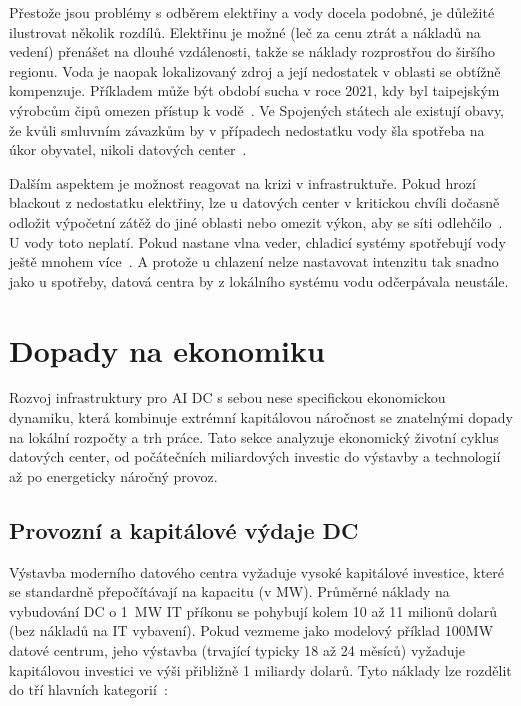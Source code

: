 Přestože jsou problémy s odběrem elektřiny a vody docela podobné, je důležité ilustrovat několik rozdílů. Elektřinu je možné (leč za cenu ztrát a nákladů na vedení) přenášet na dlouhé vzdálenosti, takže se náklady rozprostřou do širšího regionu. Voda je naopak lokalizovaný zdroj a její nedostatek v oblasti se obtížně kompenzuje. Příkladem může být období sucha v roce 2021, kdy byl taipejským výrobcům čipů omezen přístup k vodě~\cite[s.~243]{international_energy_agency_iea_energy_2025}. Ve Spojených státech ale existují obavy, že kvůli smluvním závazkům by v případech nedostatku vody šla spotřeba na úkor obyvatel, nikoli datových center~\cite{shah_four_2026}.

Dalším aspektem je možnost reagovat na krizi v infrastruktuře. Pokud hrozí blackout z nedostatku elektřiny, lze u datových center v kritickou chvíli dočasně odložit výpočetní zátěž do jiné oblasti nebo omezit výkon, aby se síti odlehčilo~\cite[s.~586]{geng_data_2014}. U vody toto neplatí. Pokud nastane vlna veder, chladicí systémy spotřebují vody ještě mnohem více~\cite[s.~3]{li_making_2025}. A protože u chlazení nelze nastavovat intenzitu tak snadno jako u spotřeby, datová centra by z lokálního systému vodu odčerpávala neustále.

\section{Dopady na ekonomiku}
\label{sec:ekonomika_dopady}

Rozvoj infrastruktury pro AI DC s sebou nese specifickou ekonomickou dynamiku, která kombinuje extrémní kapitálovou náročnost se znatelnými dopady na lokální rozpočty a trh práce. Tato sekce analyzuje ekonomický životní cyklus datových center, od počátečních miliardových investic do výstavby a technologií až po energeticky náročný provoz.

\subsection{Provozní a kapitálové výdaje DC}
\label{subsec:vydaje}

Výstavba moderního datového centra vyžaduje vysoké kapitálové investice, které se standardně přepočítávají na kapacitu (v MW). Průměrné náklady na vybudování DC o 1~MW IT příkonu se pohybují kolem 10 až 11 milionů dolarů~\cites[s. 7]{to_albertas_2025}[s. 25]{gargano_subsidizing_2025} (bez nákladů na IT vybavení). Pokud vezmeme jako modelový příklad 100MW datové centrum, jeho výstavba (trvající typicky 18 až 24 měsíců) vyžaduje kapitálovou investici ve výši přibližně 1 miliardy dolarů. Tyto náklady lze rozdělit do tří hlavních kategorií~\cite[s.~9]{pham_data_2017}:

